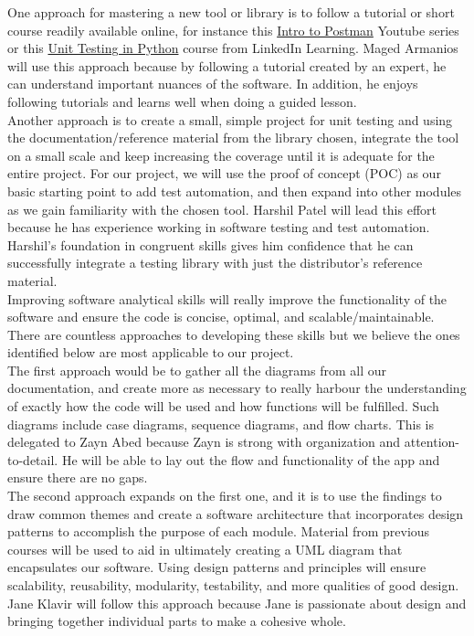 \documentclass[12pt, titlepage]{article}
\begin{document}
\begin{enumerate}
  One approach for mastering a new tool or library is to follow a tutorial or short course readily available online, for instance this \href{https://www.youtube.com/playlist?list=PLM-7VG-sgbtAgGq_pef5y_ruIUBPpUgNJ}{Intro to Postman} Youtube series or this \href{https://www.linkedin.com/learning/unit-testing-in-python}{Unit Testing in Python} course from LinkedIn Learning. Maged Armanios will use this approach because by following a tutorial created by an expert, he can understand important nuances of the software. In addition, he enjoys following tutorials and learns well when doing a guided lesson.\\
  Another approach is to create a small, simple project for unit testing and using the documentation/reference material from the library chosen, integrate the tool on a small scale and keep increasing the coverage until it is adequate for the entire project. For our project, we will use the proof of concept (POC) as our basic starting point to add test automation, and then expand into other modules as we gain familiarity with the chosen tool. Harshil Patel will lead this effort because he has experience working in software testing and test automation. Harshil's foundation in congruent skills gives him confidence that he can successfully integrate a testing library with just the distributor’s reference material.\\
  Improving software analytical skills will really improve the functionality of the software and ensure the code is concise, optimal, and scalable/maintainable. There are countless approaches to developing these skills but we believe the ones identified below are most applicable to our project.\\
  The first approach would be to gather all the diagrams from all our documentation, and create more as necessary to really harbour the understanding of exactly how the code will be used and how functions will be fulfilled. Such diagrams include case diagrams, sequence diagrams, and flow charts. This is delegated to Zayn Abed because Zayn is strong with organization and attention-to-detail. He will be able to lay out the flow and functionality of the app and ensure there are no gaps.\\
  The second approach expands on the first one, and it is to use the findings to draw common themes and create a software architecture that incorporates design patterns to accomplish the purpose of each module. Material from previous courses will be used to aid in ultimately creating a UML diagram that encapsulates our software. Using design patterns and principles will ensure scalability, reusability, modularity, testability, and more qualities of good design. Jane Klavir will follow this approach because Jane is passionate about design and bringing together individual parts to make a cohesive whole.\\

\end{enumerate}
\end{document}
